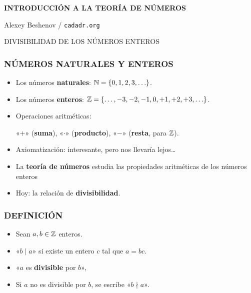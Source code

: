 



\begin{frame}
  \textbf{INTRODUCCIÓN A LA TEORÍA DE NÚMEROS}

  Alexey Beshenov / \texttt{cadadr.org}

  \vfill

  \begin{center}\huge\headingfont
    DIVISIBILIDAD DE LOS NÚMEROS ENTEROS
  \end{center}

  \vfill
\end{frame}

\begin{frame}
  \frametitle{NÚMEROS NATURALES Y ENTEROS}

  \begin{itemize}
  \item<2-> Los números \textbf{naturales}:
    $\mathbb{N} = \{ 0, 1, 2, 3, \ldots \}$.

  \item<3-> Los números \textbf{enteros}:
    $\mathbb{Z} = \{ \ldots, -3, -2, -1, 0, +1, +2, +3, \ldots \}$.

  \item<4-> Operaciones aritméticas:

    «$+$» (\textbf{suma}),
    «$\cdot$» (\textbf{producto}),
    «$-$» (\textbf{resta}, para $\mathbb{Z}$).

  \item<5-> Axiomatización: interesante, pero nos llevaría lejos\dots

  \item<6-> La \textbf{teoría de números} estudia las propiedades aritméticas de
    los números enteros

  \item<8-> Hoy: la relación de \textbf{divisibilidad}.
  \end{itemize}
\end{frame}

\begin{frame}
  \frametitle{DEFINICIÓN}

  \begin{itemize}
  \item<2-> Sean $a, b \in \mathbb{Z}$ enteros.

  \item<3-> «$b \mid a$» si existe un entero $c$ tal que $a = bc$.

  \item<4-> «$a$ es \textbf{divisible} por $b$»,



  \item<7-> Si $a$ no es divisible por $b$, se escribe «$b\nmid a$».
  \end{itemize}
\end{frame}

